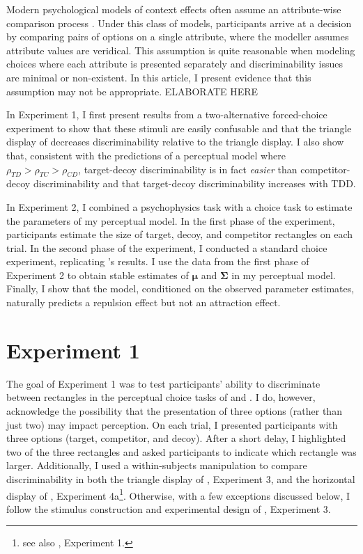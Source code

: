 {{Modern psychological models of context effects often assume an attribute-wise comparison process \parencite{roeMultialternativeDecisionField2001a,trueblood2013not,usherLossAversionInhibition2004a,bhatiaAssociationsAccumulationPreference2013b}. Under this class of models, participants arrive at a decision by comparing pairs of options on a single attribute, where the modeller assumes attribute values are veridical. This assumption is quite reasonable when modeling choices where each attribute is presented separately and discriminability issues are minimal or non-existent. In this article, I present evidence that this assumption may not be appropriate. ELABORATE HERE

In Experiment 1, I first present results from a two-alternative forced-choice experiment to show that these stimuli are easily confusable and that the triangle display of \textcite{spektorWhenGoodLooks2018b} decreases discriminability relative to the triangle display. I also show that, consistent with the predictions of a perceptual model where $\rho_{TD}>\rho_{TC}>\rho_{CD}$, target-decoy discriminability is in fact \textit{easier} than competitor-decoy discriminability and that target-decoy discriminability increases with TDD. 

In Experiment 2, I combined a psychophysics task with a choice task to estimate the parameters of my perceptual model. In the first phase of the experiment, participants estimate the size of target, decoy, and competitor rectangles on each trial. In the second phase of the experiment, I conducted a standard choice experiment, replicating \textcite{spektorWhenGoodLooks2018b}'s results. I use the data from the first phase of Experiment 2 to obtain stable estimates of  $\mathbf{\mu}$ and $\mathbf{\Sigma}$ in my perceptual model. Finally, I show that the model, conditioned on the observed parameter estimates, naturally predicts a repulsion effect but not an attraction effect.  

\section{Experiment 1}

The goal of Experiment 1 was to test participants' ability to discriminate between rectangles in the perceptual choice tasks of \textcite{trueblood2013not} and \textcite{spektorWhenGoodLooks2018b}. I do, however, acknowledge the possibility that the presentation of three options (rather than just two) may impact perception. 
On each trial, I presented participants with three options (target, competitor, and decoy). After a short delay, I highlighted two of the three rectangles and asked participants to indicate which rectangle was larger. 
Additionally, I used a within-subjects manipulation to compare discriminability in both the triangle display of \textcite{spektorWhenGoodLooks2018b}, Experiment 3, and the horizontal display of \textcite{spektorWhenGoodLooks2018b}, Experiment 4a\footnote{see also \textcite{trueblood2013not}, Experiment 1.}. Otherwise, with a few exceptions discussed below, I follow the stimulus construction and experimental design of \textcite{spektorWhenGoodLooks2018b}, Experiment 3. 

}}
